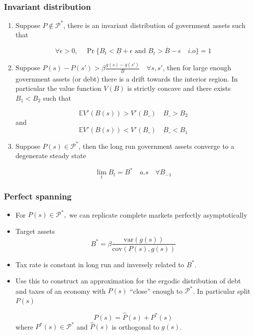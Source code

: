 \documentclass{beamer}
\begin{document}
\begin{frame}

\frametitle{Invariant distribution}
\begin{theorem}
\begin{enumerate}
\small

 \item Suppose $P\not \in \mathcal{P}^*$, there is an invariant distribution of government assets such that 

\[\forall \epsilon>0, \quad \Pr\{B_t<\underline{B}+\epsilon \text{ and } B_t>\overline{B}-\epsilon \quad i.o \}=1\]

\item Suppose  $P(s)-P(s')>\beta \frac{g(s)-g(s')}{\underline{B}} \quad \forall s,s'$, then for large enough government assets (or debt) there is a drift towards the interior region.  In particular the value function $V(B)$ is strictly concave and there exists $B_1<B_2$ such that

\[\mathbb{E}V'(B(s))>V'(B\_) \quad B\_>B_2 \]
and
\[\mathbb{E}V'(B(s))<V'(B\_) \quad B\_<B_1 \]

\item Suppose $P(s)\in \mathcal{P}^*$, then the  long run government assets converge to a degenerate steady state

\[\lim_tB_t=  B^*\quad a.s \quad \forall B_{-1} \]


\end{enumerate}


\end{theorem}


\end{frame}%



\begin{frame}%

\frametitle{Perfect spanning}\label{linearization}

\begin{itemize}
\item \smallskip For $P(s)\in \mathcal{P}^{\ast },$ we can
replicate complete markets perfectly asymptotically

\item Target assets%
\begin{equation*}
B^{\ast }=\beta \frac{\mathrm{var}(g(s))}{\mathrm{cov}(P(s),g(s))}
\end{equation*}

\item Tax rate is constant in long run and inversely related to $B^*$.


\item Use this to construct an approximation for the ergodic distribution of debt and taxes of an economy with $P(s)$ ``close'' enough to $\mathcal{P}^*$. In particular split $P(s)$

\[P(s)=\hat{P}(s)+P^*(s)\] where $P^*(s)\in \mathcal{P}^*$ and $\hat{P}(s)$ is orthogonal to $g(s)$. 
\hyperlink{linear appendix}{}
\end{itemize}
\end{frame}%
\end{document}

